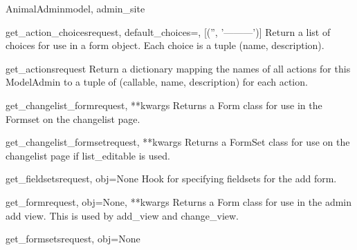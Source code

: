 \documentclass[letterpaper,10pt,english]{sphinxmanual}
\begin{document}
\begin{classdesc}{AnimalAdmin}{model, admin\_site}
\hypertarget{animal.admin.AnimalAdmin.get_action_choices}{}\begin{methoddesc}{get\_action\_choices}{request, default\_choices=, {[}('', '---------'){]}}
Return a list of choices for use in a form object.  Each choice is a
tuple (name, description).
\end{methoddesc}

\hypertarget{animal.admin.AnimalAdmin.get_actions}{}\begin{methoddesc}{get\_actions}{request}
Return a dictionary mapping the names of all actions for this
ModelAdmin to a tuple of (callable, name, description) for each action.
\end{methoddesc}

\hypertarget{animal.admin.AnimalAdmin.get_changelist_form}{}\begin{methoddesc}{get\_changelist\_form}{request, **kwargs}
Returns a Form class for use in the Formset on the changelist page.
\end{methoddesc}

\hypertarget{animal.admin.AnimalAdmin.get_changelist_formset}{}\begin{methoddesc}{get\_changelist\_formset}{request, **kwargs}
Returns a FormSet class for use on the changelist page if list\_editable
is used.
\end{methoddesc}

\hypertarget{animal.admin.AnimalAdmin.get_fieldsets}{}\begin{methoddesc}{get\_fieldsets}{request, obj=None}
Hook for specifying fieldsets for the add form.
\end{methoddesc}

\hypertarget{animal.admin.AnimalAdmin.get_form}{}\begin{methoddesc}{get\_form}{request, obj=None, **kwargs}
Returns a Form class for use in the admin add view. This is used by
add\_view and change\_view.
\end{methoddesc}

\hypertarget{animal.admin.AnimalAdmin.get_formsets}{}\begin{methoddesc}{get\_formsets}{request, obj=None}\end{methoddesc}


\end{classdesc}
\end{document}
